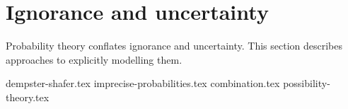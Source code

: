 \section{Ignorance and uncertainty}

Probability theory conflates ignorance and uncertainty.
This section describes approaches to explicitly modelling them.

{dempster-shafer.tex}
{imprecise-probabilities.tex}
{combination.tex}
{possibility-theory.tex}